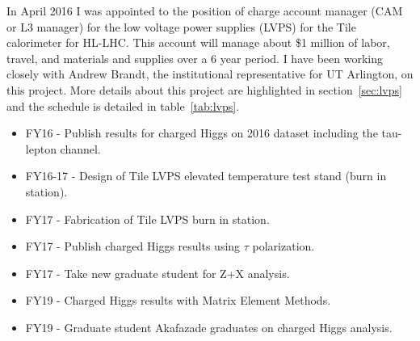 In April 2016 I was appointed to the position of charge account manager (CAM or L3 manager) for the low voltage power supplies (LVPS) for the Tile calorimeter for HL-LHC.  This account will manage about \$1 million 
of labor, travel, and materials and supplies over a 6 year period.  
I have been working closely with Andrew Brandt, the institutional representative for UT Arlington, on this project.
More details about this project are highlighted in section~\ref{sec:lvps} and the schedule is detailed in table~\ref{tab:lvps}.


\begin{itemize}[noitemsep,nolistsep]
\item{FY16 - Publish results for charged Higgs on 2016 dataset including the tau-lepton channel.}
\item{FY16-17 - Design of Tile LVPS elevated temperature test stand (burn in station).}
\item{FY17 - Fabrication of Tile LVPS burn in station.}
\item{FY17 - Publish charged Higgs results using $\tau$ polarization.}
\item{FY17 - Take new graduate student for Z+X analysis.}
\item{FY19 - Charged Higgs results with Matrix Element Methods.}
\item{FY19 - Graduate student Akafazade graduates on charged Higgs analysis.}
\end{itemize}

